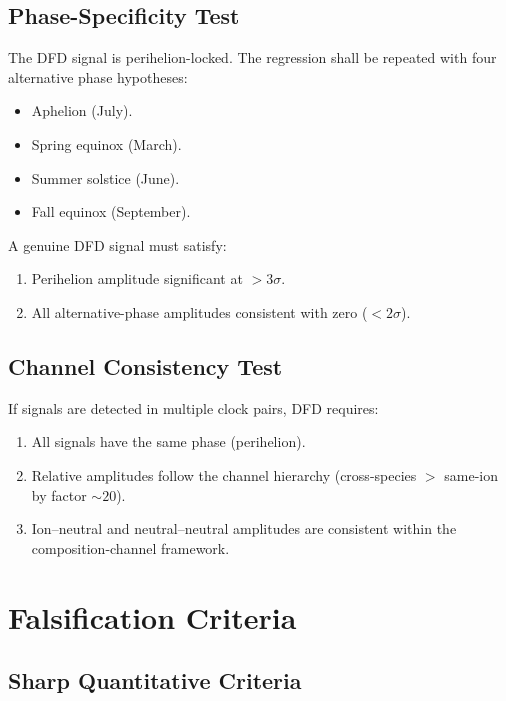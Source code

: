 \documentclass[twocolumn,showpacs,preprintnumbers,amsmath,amssymb,prd]{revtex4-2}
\begin{document}
\subsection{Phase-Specificity Test}

The DFD signal is perihelion-locked.  The regression shall be
repeated with four alternative phase hypotheses:
\begin{itemize}
\item Aphelion (July).
\item Spring equinox (March).
\item Summer solstice (June).
\item Fall equinox (September).
\end{itemize}
A genuine DFD signal must satisfy:
\begin{enumerate}
\item Perihelion amplitude significant at $>3\sigma$.
\item All alternative-phase amplitudes consistent with zero
  ($<2\sigma$).
\end{enumerate}

\subsection{Channel Consistency Test}

If signals are detected in multiple clock pairs, DFD requires:
\begin{enumerate}
\item All signals have the same phase (perihelion).
\item Relative amplitudes follow the channel hierarchy
  (cross-species $>$ same-ion by factor $\sim 20$).
\item Ion--neutral and neutral--neutral amplitudes are consistent
  within the composition-channel framework.
\end{enumerate}

\section{Falsification Criteria}\label{sec:falsification}

\subsection{Sharp Quantitative Criteria}
\end{document}
